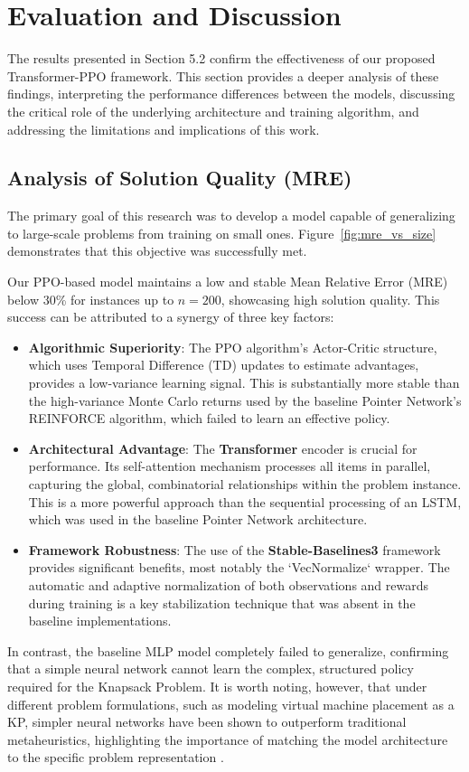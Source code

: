 
\section{Evaluation and Discussion}
\label{sec:discussion}

The results presented in Section 5.2 confirm the effectiveness of our proposed Transformer-PPO framework.
This section provides a deeper analysis of these findings, interpreting the performance differences between the models, discussing the critical role of the underlying architecture and training algorithm, and addressing the limitations and implications of this work.

\subsection{Analysis of Solution Quality (MRE)}
The primary goal of this research was to develop a model capable of generalizing to large-scale problems from training on small ones.
Figure~\ref{fig:mre_vs_size} demonstrates that this objective was successfully met.

Our PPO-based model maintains a low and stable Mean Relative Error (MRE) below 30\% for instances up to $n=200$, showcasing high solution quality.
This success can be attributed to a synergy of three key factors:
\begin{itemize}
    \item \textbf{Algorithmic Superiority}: The PPO algorithm's Actor-Critic structure, which uses Temporal Difference (TD) updates to estimate advantages, provides a low-variance learning signal.
This is substantially more stable than the high-variance Monte Carlo returns used by the baseline Pointer Network's REINFORCE algorithm, which failed to learn an effective policy.
\item \textbf{Architectural Advantage}: The \textbf{Transformer} encoder is crucial for performance.
Its self-attention mechanism processes all items in parallel, capturing the global, combinatorial relationships within the problem instance.
This is a more powerful approach than the sequential processing of an LSTM, which was used in the baseline Pointer Network architecture.
\item \textbf{Framework Robustness}: The use of the \textbf{Stable-Baselines3} framework provides significant benefits, most notably the `VecNormalize` wrapper.
The automatic and adaptive normalization of both observations and rewards during training is a key stabilization technique that was absent in the baseline implementations.
\end{itemize}
In contrast, the baseline MLP model completely failed to generalize, confirming that a simple neural network cannot learn the complex, structured policy required for the Knapsack Problem. It is worth noting, however, that under different problem formulations, such as modeling virtual machine placement as a KP, simpler neural networks have been shown to outperform traditional metaheuristics, highlighting the importance of matching the model architecture to the specific problem representation \cite{abidSolving012023}.

